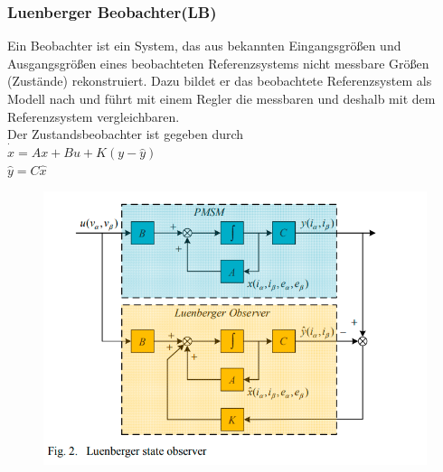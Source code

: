 \documentclass[serif,11pt, xcolor=table]{beamer}
\begin{document}
\begin{frame}
	\frametitle{Luenberger Beobachter(LB)}
	  
	\tiny{Ein Beobachter ist ein System, das aus bekannten Eingangsgrößen und Ausgangsgrößen eines beobachteten Referenzsystems nicht messbare Größen (Zustände) rekonstruiert. Dazu bildet er das beobachtete Referenzsystem als Modell nach und führt mit einem Regler die messbaren und deshalb mit dem Referenzsystem vergleichbaren.}\\
	\vskip 0.2cm
	Der Zustandsbeobachter ist gegeben durch\\
	$\dot{\hat{x}}=Ax+Bu+K(y-\hat{y})$\\
	$\hat{y}=C\hat{x}$
	
	\begin{figure}[htbp]
		\centering
		\includegraphics[scale=0.35]{Abbildungen/Luenberger state observert.png}
		
	\end{figure}	
\end{frame}
\end{document}
